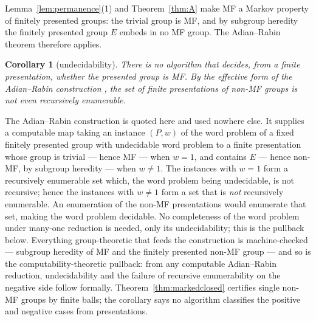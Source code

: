 \documentclass[11pt]{amsart}
\newcommand{\leanverified}[2]{\ignorespaces}
\newtheorem{corollary}[theorem]{Corollary}
\theoremstyle{definition}
\theoremstyle{remark}
\theoremstyle{plain}
\begin{document}
Lemma~\ref{lem:permanence}(1) and Theorem~\ref{thm:A} make MF a Markov
property of finitely presented groups: the trivial group is MF, and by
subgroup heredity the finitely presented group $E$ embeds in no MF
group.  The Adian--Rabin theorem \cite{Rabin58} therefore applies.

\begin{corollary}[undecidability]\label{cor:undecidable}
There is no algorithm that decides, from a finite presentation,
whether the presented group is MF\@.  By the effective form of the
Adian--Rabin construction \cite{Rabin58}, the set of finite
presentations of non-MF groups is not even recursively enumerable.
\end{corollary}

The Adian--Rabin construction \cite{Rabin58} is quoted here and used
nowhere else.  It supplies a computable map taking
an instance $(P,w)$ of the word problem of a fixed finitely presented
group with undecidable word problem to a finite presentation whose
group is trivial --- hence MF --- when $w=1$, and contains $E$ ---
hence non-MF, by subgroup heredity --- when $w\ne1$.  The instances
with $w=1$ form a recursively enumerable set which, the word problem
being undecidable, is not recursive; hence the instances with $w\ne1$
form a set that is \emph{not} recursively enumerable.  An enumeration
of the non-MF presentations would enumerate that set, making the word
problem decidable.  No completeness of the word problem under
many-one reduction is needed, only its undecidability; this is the
pullback below.  Everything
group-theoretic that feeds the construction is machine-checked ---
subgroup heredity of MF and the finitely presented non-MF group ---
and so is the computability-theoretic pullback: from any computable
Adian--Rabin reduction, undecidability and the failure of recursive
enumerability on the negative side follow formally.
\leanverified{Computability/MarkovMFConsequences}{GroupApproximation.MarkovMFConsequences.operatorMF_subgroup_hereditary}
\leanverified{Computability/MarkovMFConsequences}{GroupApproximation.MarkovMFConsequences.exists_finitelyPresented_nonOperatorMF}
\leanverified{Computability/MarkovMFConsequences}{GroupApproximation.MarkovMFConsequences.operatorMF_recognition_undecidable}
Theorem~\ref{thm:markedclosed} certifies single non-MF groups by
finite balls; the corollary says no algorithm classifies the positive
and negative cases from presentations.
\end{document}
